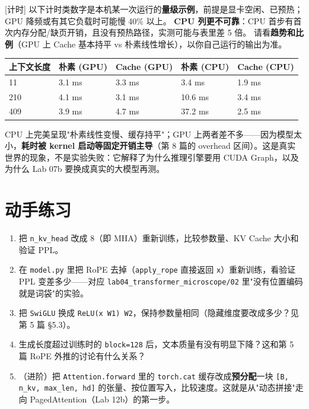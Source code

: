 \begin{noteBox}[核心导读与背景]
{}[计时] 以下计时类数字是本机某一次运行的\textbf{量级示例}，前提是显卡空闲、已预热；GPU 降频或有其它负载时可能慢 40\% 以上。
\textbf{CPU 列更不可靠}：CPU 首步有首次内存分配/缺页开销，且没有预热路径，实测可能与表里差 5 倍。
请看\textbf{趋势和比例}（GPU 上 Cache 基本持平 vs 朴素线性增长），以你自己运行的输出为准。
\end{noteBox}

\begin{center}
\small
\begin{tabularx}{\textwidth}{l X X X X }
\toprule
\textbf{上下文长度} & \textbf{朴素 (GPU)} & \textbf{Cache (GPU)} & \textbf{朴素 (CPU)} & \textbf{Cache (CPU)} \\
\midrule
11 & 3.1 ms & 3.3 ms & 3.4 ms & 1.9 ms \\
210 & 4.1 ms & 3.1 ms & 10.6 ms & 3.4 ms \\
409 & 3.9 ms & 4.7 ms & 37.2 ms & 2.5 ms \\
\bottomrule
\end{tabularx}
\end{center}

CPU 上完美呈现"朴素线性变慢、缓存持平"；GPU 上两者差不多——因为模型太小，\textbf{耗时被 kernel 启动等固定开销主导}（第 8 篇的 overhead 区间）。这是真实世界的现象，不是实验失败：它解释了为什么推理引擎要用 CUDA Graph，以及为什么 Lab 07b 要换成真实的大模型再测。

\section{动手练习}

\begin{enumerate}
  \item 把 \texttt{n\_kv\_head} 改成 8（即 MHA）重新训练，比较参数量、KV Cache 大小和验证 PPL。
  \item 在 \texttt{model.py} 里把 RoPE 去掉（\texttt{apply\_rope} 直接返回 \texttt{x}）重新训练，看验证 PPL 变差多少——对应 \texttt{lab04\_transformer\_microscope/02} 里"没有位置编码就是词袋"的实验。
  \item 把 \texttt{SwiGLU} 换成 \texttt{ReLU(x W1) W2}，保持参数量相同（隐藏维度要改成多少？见第 5 篇 §5.3）。
  \item 生成长度超过训练时的 \texttt{block=128} 后，文本质量有没有明显下降？这和第 5 篇 RoPE 外推的讨论有什么关系？
  \item （进阶）把 \texttt{Attention.forward} 里的 \texttt{torch.cat} 缓存改成\textbf{预分配}一块 \texttt{[B, n\_kv, max\_len, hd]} 的张量、按位置写入，比较速度。这就是从"动态拼接"走向 PagedAttention（Lab 12b）的第一步。
\end{enumerate}

